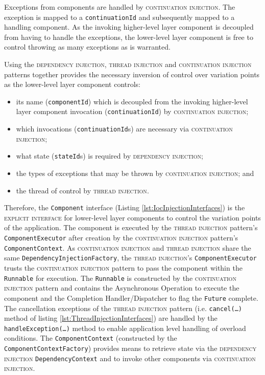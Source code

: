 \documentclass[prodmode]{style/acmlarge}
\begin{document}
Exceptions from components are handled by \textsc{continuation injection}.  The
exception is mapped to a \texttt{continuationId} and subsequently mapped to a
handling component.  As the  invoking higher-level layer component is decoupled
from having to handle the exceptions, the lower-level layer component is free to
control throwing as many exceptions as is warranted.

Using the \textsc{dependency injection}, \textsc{thread injection} and
\textsc{continuation injection} patterns together provides the necessary inversion
of control over variation points as the lower-level layer component controls:
\begin{itemize}
  \item its name (\texttt{componentId}) which is decoupled from the invoking higher-level layer component invocation (\texttt{contin\-uationId}) by \textsc{continuation injection};
  \item which invocations (\texttt{continuationId}s) are necessary via \textsc{continuation injection};
  \item what state (\texttt{stateId}s) is required by \textsc{dependency injection};
  \item the types of exceptions that may be thrown by \textsc{continuation injection}; and
  \item the thread of control by \textsc{thread injection}.
\end{itemize}

Therefore, the \texttt{Component} interface (Listing
\ref{lst:IocInjectionInterfaces}) is the \textsc{explicit interface} for
lower-level layer components to control the variation points of the application.
 The component is executed by the \textsc{thread injection} pattern's
\texttt{ComponentExecutor} after creation by the \textsc{continuation injection}
pattern's \texttt{ComponentContext}.  As \textsc{continuation injection} and
\textsc{thread injection} share the same \texttt{DependencyInjectionFactory},
the \textsc{thread injection}'s \texttt{ComponentExecutor} trusts the
\textsc{continuation injection} pattern to pass the component within the
\texttt{Runnable} for execution.  The \texttt{Runnable} is constructed by the
\textsc{continuation injection} pattern and contains the Asynchronous Operation
to execute the component and the Completion Handler/Dispatcher to flag the
\texttt{Future} complete.  The cancellation exceptions of the \textsc{thread
injection} pattern (i.e. \texttt{cancel(\ldots)} method of listing
\ref{lst:ThreadInjectionInterfaces}) are handled by the
\texttt{handleException(\ldots)} method to enable application level handling of
overload conditions.  The \texttt{ComponentContext} (constructed by the
\texttt{ComponentContextFactory}) provides means to retrieve state via the
\textsc{dependency injection} \texttt{Dependency\-Context} and to invoke other
components via \textsc{continuation injection}.
\end{document}
